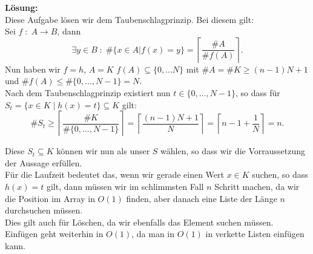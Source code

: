 \documentclass[11pt,a4paper,ngerman]{article}
\begin{document}
\begin{enumerate}[\bfseries a)]
\textbf{Lösung:}\\
Diese Aufgabe lösen wir dem Taubenschlagprinzip. Bei diesem gilt: \\
Sei 
$f \; : \; A \rightarrow B$, dann $$\exists y \in B \; : \; \#\{x \in A | f(x) = y \} = \left\lceil \frac{ \#A}{ \#f(A)} \right\rceil.$$
Nun haben wir $f=h$, $A = K$ $f(A) \subseteq \{0,...N\}$ mit $\#A = \# K \geq (n-1)N+1$ und $\# f(A) \leq \# \{0,...,N-1 \} = N$.\\

Nach dem Taubenschlagprinzip existiert nun $t \in \{0, ..., N-1 \}$, so dass für $S_t = \{ x \in K \; | \; h(x) = t \} \subseteq K$  gilt:
$$
\#S_t \geq \left\lceil \frac{\#K}{\#\{0,...,N-1\}} \right\rceil = \left\lceil \frac{(n-1)N+1}{N} \right\rceil = \left\lceil n-1 + \frac{1}{N} \right\rceil = n.
$$

Diese $S_t \subseteq K$ können wir nun als unser $S$ wählen, so dass wir die Vorraussetzung der Aussage erfüllen.\\

Für die Laufzeit bedeutet das, wenn wir gerade einen Wert $x \in K$ suchen, so dass $h(x) = t$ gilt, dann müssen wir im schlimmsten Fall $n$ Schritt machen, da wir die Position im Array in $O(1)$ finden, aber danach eine Liste der Länge $n$ durchsuchen müssen.\\

Dies gilt auch für Löschen, da wir ebenfalls das Element suchen müssen.\\

Einfügen geht weiterhin in $O(1)$, da man in $O(1)$ in verkette Listen einfügen kann.

\end{enumerate}

\label{LastPage}
\end{document}
